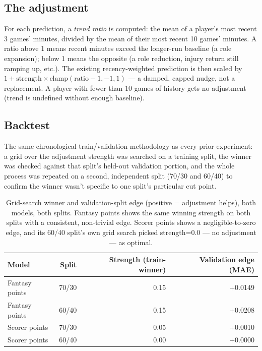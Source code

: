 \documentclass[11pt]{article}
\begin{document}
\subsection{The adjustment}

For each prediction, a \emph{trend ratio} is computed: the mean of a player's most recent 3 games' minutes,
divided by the mean of their most recent 10 games' minutes. A ratio above 1 means recent minutes exceed the
longer-run baseline (a role expansion); below 1 means the opposite (a role reduction, injury return still
ramping up, etc.). The existing recency-weighted prediction is then scaled by
$1 + \text{strength} \times \text{clamp}(\text{ratio} - 1, -1, 1)$ — a damped, capped nudge, not a
replacement. A player with fewer than 10 games of history gets no adjustment (trend is undefined without
enough baseline).

\subsection{Backtest}

The same chronological train/validation methodology as every prior experiment: a grid over the adjustment
strength was searched on a training split, the winner was checked against that split's held-out validation
portion, and the whole process was repeated on a second, independent split (70/30 and 60/40) to confirm the
winner wasn't specific to one split's particular cut point.

\begin{table}[h]
\centering
\small
\begin{tabular}{lrrr}
\toprule
Model & Split & Strength (train-winner) & Validation edge (MAE) \\
\midrule
Fantasy points & 70/30 & 0.15 & +0.0149 \\
Fantasy points & 60/40 & 0.15 & +0.0208 \\
Scorer points & 70/30 & 0.05 & +0.0010 \\
Scorer points & 60/40 & 0.00 & +0.0000 \\
\bottomrule
\end{tabular}
\caption{Grid-search winner and validation-split edge (positive = adjustment helps), both models, both
splits. Fantasy points shows the same winning strength on both splits with a consistent, non-trivial edge.
Scorer points shows a negligible-to-zero edge, and its 60/40 split's own grid search picked strength=0.0 —
no adjustment — as optimal.}
\end{table}
\end{document}
